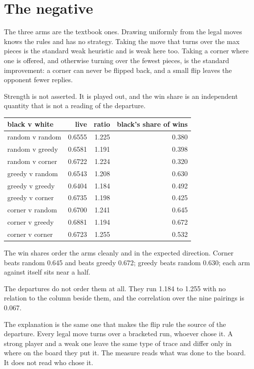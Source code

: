 \section{The negative}

The three arms are the textbook ones. Drawing uniformly from the legal moves knows the rules and
has no strategy. Taking the move that turns over the max pieces is the standard weak heuristic and is
weak here too. Taking a corner where one is offered, and otherwise turning over the fewest pieces, is
the standard improvement: a corner can never be flipped back, and a small flip leaves the opponent
fewer replies.

Strength is not asserted. It is played out, and the win share is an independent quantity that is not
a reading of the departure.

\begin{center}
\begin{tabular}{@{}lrrr@{}}
\toprule
black v white & live & ratio & black's share of wins \\
\midrule
random v random & 0.6555 & 1.225 & 0.380 \\
random v greedy & 0.6581 & 1.191 & 0.398 \\
random v corner & 0.6722 & 1.224 & 0.320 \\
greedy v random & 0.6543 & 1.208 & 0.630 \\
greedy v greedy & 0.6404 & 1.184 & 0.492 \\
greedy v corner & 0.6735 & 1.198 & 0.425 \\
corner v random & 0.6700 & 1.241 & 0.645 \\
corner v greedy & 0.6881 & 1.194 & 0.672 \\
corner v corner & 0.6723 & 1.255 & 0.532 \\
\bottomrule
\end{tabular}
\end{center}

The win shares order the arms cleanly and in the expected direction. Corner beats random 0.645 and
beats greedy 0.672; greedy beats random 0.630; each arm against itself sits near a half.

The departures do not order them at all. They run 1.184 to 1.255 with no relation to the column
beside them, and the correlation over the nine pairings is 0.067.

The explanation is the same one that makes the flip rule the source of the departure. Every legal
move turns over a bracketed run, whoever chose it. A strong player and a weak one leave the same type
of trace and differ only in where on the board they put it. The measure reads what was done to
the board. It does not read who chose it.

